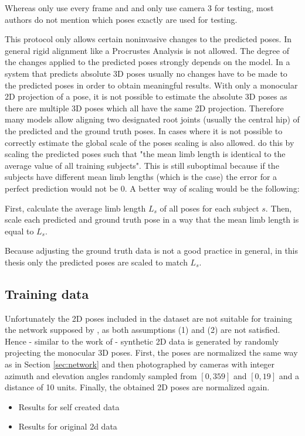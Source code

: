 Whereas \citet{sun17} only use every  frame and \citet{moreno-noguer16} and \citet{bogo16} only use camera 3 for testing, most authors do not mention which poses exactly are used for testing.

This protocol only allows certain noninvasive changes to the predicted poses.
In general rigid alignment like a Procrustes Analysis is not allowed.
The degree of the changes applied to the predicted poses strongly depends on the model.
In a system that predicts absolute 3D poses usually no changes have to be made to the predicted poses in order to obtain meaningful results.
With only a monocular 2D projection of a pose, it is not possible to estimate the absolute 3D poses as there are multiple 3D poses which all have the same 2D projection.
Therefore many models \cite{martinez17, zhou18, zhou16, tekin16, pavlakos17} allow aligning two designated root joints (usually the central hip) of the predicted and the ground truth poses.
In cases where it is not possible to correctly estimate the global scale of the poses scaling is also allowed.
\citet{zhou18} do this by scaling the predicted poses such that "the mean limb length is identical to the average value of all training subjects".
This is still suboptimal because if the subjects have different mean limb lengths (which is the case) the error for a perfect prediction would not be 0.
A better way of scaling would be the following:

First, calculate the average limb length $L_s$ of all poses for each subject $s$.
Then, scale each predicted and ground truth pose in a way that the mean limb length is equal to $L_s$.

Because adjusting the ground truth data is not a good practice in general, in this thesis only the predicted poses are scaled to match $L_s$.

\subsection{Training data}\label{sec:data-results}

Unfortunately the 2D poses included in the dataset are not suitable for training the network supposed by \citet{drover18}, as both assumptions (1) and (2) are not satisfied.
Hence - similar to the work of \citet{drover18} - synthetic 2D data is generated by randomly projecting the monocular 3D poses.
First, the poses are normalized the same way as in Section \ref{sec:network} and then photographed by cameras with integer azimuth and elevation angles randomly sampled from $[0, 359]$ and $[0, 19]$ and a distance of 10 units.
Finally, the obtained 2D poses are normalized again.


\begin{itemize}
	\item Results for self created data
	\item Results for original 2d data
\end{itemize}